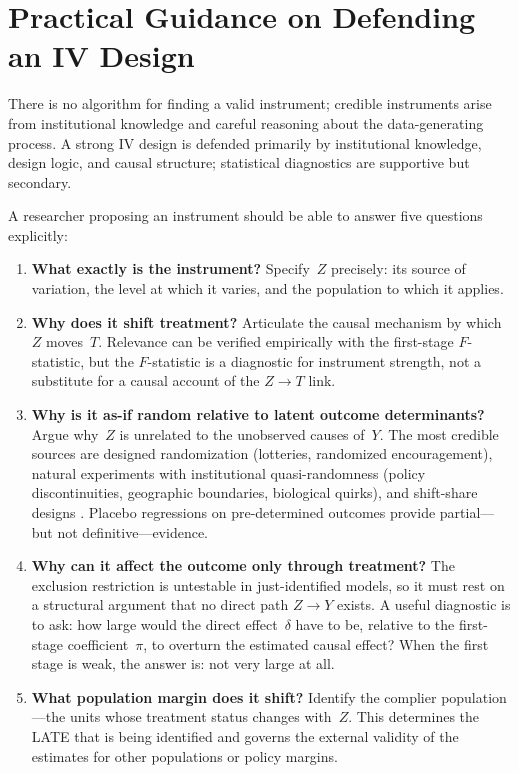 \documentclass[master.tex]{subfiles}
\begin{document}
\section{Practical Guidance on Defending an IV Design}
\label{w7:sec:practical}

There is no algorithm for finding a valid instrument; credible
instruments arise from institutional knowledge and careful reasoning
about the data-generating process.  A strong IV design is defended
primarily by institutional knowledge, design logic, and causal
structure; statistical diagnostics are supportive but secondary.

A researcher proposing an instrument should be able to answer
five questions explicitly:

\begin{enumerate}
  \item \textbf{What exactly is the instrument?}  Specify~$Z$
    precisely: its source of variation, the level at which it varies,
    and the population to which it applies.

  \item \textbf{Why does it shift treatment?}  Articulate the causal
    mechanism by which~$Z$ moves~$T$.  Relevance can be verified
    empirically with the first-stage $F$-statistic, but the
    $F$-statistic is a diagnostic for instrument strength, not a
    substitute for a causal account of the $Z \to T$ link.

  \item \textbf{Why is it as-if random relative to latent outcome
    determinants?}  Argue why~$Z$ is unrelated to the unobserved
    causes of~$Y$.  The most credible sources are designed
    randomization (lotteries, randomized encouragement), natural
    experiments with institutional quasi-randomness (policy
    discontinuities, geographic boundaries, biological quirks), and
    shift-share designs \citep{bartik1991benefits,
    goldsmith2020bartik}.  Placebo regressions on pre-determined
    outcomes provide partial---but not definitive---evidence.

  \item \textbf{Why can it affect the outcome only through
    treatment?}  The exclusion restriction is untestable in
    just-identified models, so it must rest on a structural argument
    that no direct path $Z \to Y$ exists.  A useful diagnostic is to
    ask: how large would the direct effect~$\delta$ have to be,
    relative to the first-stage coefficient~$\pi$, to overturn the
    estimated causal effect?  When the first stage is weak, the
    answer is: not very large at all.

  \item \textbf{What population margin does it shift?}  Identify the
    complier population---the units whose treatment status changes
    with~$Z$.  This determines the LATE that is being identified and
    governs the external validity of the estimates for other
    populations or policy margins.
\end{enumerate}
\end{document}
